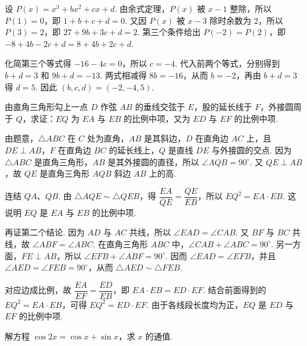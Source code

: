 \documentclass[UTF8,a4paper,oneside,11pt]{ctexbook}
\begin{document}
\begin{solution}
设 \(P(x)=x^{3}+bx^{2}+cx+d\). 由余式定理，\(P(x)\) 被 \(x-1\) 整除，所以 \(P(1)=0\)，即 \(1+b+c+d=0\). 又因 \(P(x)\) 被 \(x-3\) 除时余数为 \(2\)，所以 \(P(3)=2\)，即 \(27+9b+3c+d=2\). 第三个条件给出 \(P(-2)=P(2)\)，即 \(-8+4b-2c+d=8+4b+2c+d\).

化简第三个等式得 \(-16-4c=0\)，所以 \(c=-4\). 代入前两个等式，分别得到 \(b+d=3\) 和 \(9b+d=-13\). 两式相减得 \(8b=-16\)，从而 \(b=-2\)，再由 \(b+d=3\) 得 \(d=5\). 因此 \((b,c,d)=(-2,-4,5)\).
\end{solution}

\begin{problem}
由直角三角形勾上一点 \(D\) 作弦 \(AB\) 的垂线交弦于 \(E\)，股的延长线于 \(F\)，外接圆周于 \(Q\)，求证：\(EQ\) 为 \(EA\) 与 \(EB\) 的比例中项，又为 \(ED\) 与 \(EF\) 的比例中项.
\end{problem}

\begin{solution}
由题意，\(\triangle ABC\) 在 \(C\) 处为直角，\(AB\) 是其斜边，\(D\) 在直角边 \(AC\) 上，且 \(DE\perp AB\)，\(F\) 在直角边 \(BC\) 的延长线上，\(Q\) 是直线 \(DE\) 与外接圆的交点. 因为 \(\triangle ABC\) 是直角三角形，\(AB\) 是其外接圆的直径，所以 \(\angle AQB=90^{\circ}\). 又 \(QE\perp AB\)，故 \(QE\) 是直角三角形 \(AQB\) 斜边 \(AB\) 上的高.

连结 \(QA\)、\(QB\). 由 \(\triangle AQE\sim\triangle QEB\)，得 \(\dfrac{EA}{QE}=\dfrac{QE}{EB}\)，所以 \(EQ^{2}=EA\cdot EB\). 这说明 \(EQ\) 是 \(EA\) 与 \(EB\) 的比例中项.

再证第二个结论. 因为 \(AD\) 与 \(AC\) 共线，所以 \(\angle EAD=\angle CAB\). 又 \(BF\) 与 \(BC\) 共线，故 \(\angle ABF=\angle ABC\). 在直角三角形 \(ABC\) 中，\(\angle CAB+\angle ABC=90^{\circ}\). 另一方面，\(FE\perp AB\)，所以 \(\angle EFB+\angle ABF=90^{\circ}\). 因而 \(\angle EAD=\angle EFB\)，并且 \(\angle AED=\angle FEB=90^{\circ}\)，从而 \(\triangle AED\sim\triangle FEB\).

对应边成比例，故 \(\dfrac{EA}{EF}=\dfrac{ED}{EB}\)，即 \(EA\cdot EB=ED\cdot EF\). 结合前面得到的 \(EQ^{2}=EA\cdot EB\)，可得 \(EQ^{2}=ED\cdot EF\). 由于各线段长度均为正，\(EQ\) 是 \(ED\) 与 \(EF\) 的比例中项.
\end{solution}

\begin{problem}
解方程 \(\cos 2x=\cos x+\sin x\)，求 \(x\) 的通值.
\end{problem}
\end{document}
